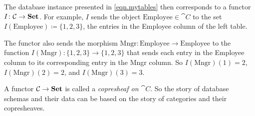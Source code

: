 \documentclass[Book-Poly]{subfiles}
\begin{document}
The database instance presented in \eqref{eqn.mytables} then corresponds to a functor $I\colon\mathcal{C}\to\mathbf{Set}$.
For example, $I$ sends the object $\text{Employee}\in\cat{C}$ to the set $I(\text{Employee})\coloneqq\{1,2,3\}$, the entries in the Employee column of the left table.

The functor also sends the morphism $\text{Mngr}\colon\text{Employee}\to\text{Employee}$ to the function $I(\text{Mngr})\colon\{1,2,3\}\to\{1,2,3\}$ that sends each entry in the Employee column to its corresponding entry in the Mngr column.
So $I(\text{Mngr})(1)=2$, $I(\text{Mngr})(2)=2$, and $I(\text{Mngr})(3)=3$.

A functor $\mathcal{C}\to\mathbf{Set}$ is called a \emph{copresheaf on $\cat{C}$}. So the story of database schemas and their data can be based on the story of categories and their copresheaves.
\end{document}
